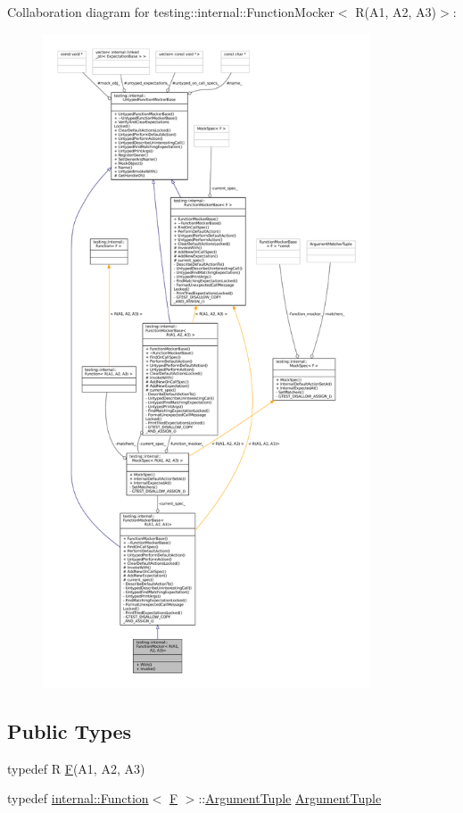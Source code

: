 Collaboration diagram for testing\+:\+:internal\+:\+:Function\+Mocker$<$ R(A1, A2, A3)$>$\+:
\nopagebreak
\begin{figure}[H]
\begin{center}
\leavevmode
\includegraphics[height=550pt]{classtesting_1_1internal_1_1FunctionMocker_3_01R_07A1_00_01A2_00_01A3_08_4__coll__graph}
\end{center}
\end{figure}
\subsection*{Public Types}
\begin{DoxyCompactItemize}
\item 
typedef R \hyperlink{classtesting_1_1internal_1_1FunctionMocker_3_01R_07A1_00_01A2_00_01A3_08_4_a8c471830f963b8012785eb3eeca2cc9c}{F}(A1, A2, A3)
\item 
typedef \hyperlink{structtesting_1_1internal_1_1Function}{internal\+::\+Function}$<$ \hyperlink{classtesting_1_1internal_1_1FunctionMocker_3_01R_07A1_00_01A2_00_01A3_08_4_a8c471830f963b8012785eb3eeca2cc9c}{F} $>$\+::\hyperlink{classtesting_1_1internal_1_1FunctionMocker_3_01R_07A1_00_01A2_00_01A3_08_4_a347dcf4c054a5f1fbd0e2f0ad1c5e2f3}{Argument\+Tuple} \hyperlink{classtesting_1_1internal_1_1FunctionMocker_3_01R_07A1_00_01A2_00_01A3_08_4_a347dcf4c054a5f1fbd0e2f0ad1c5e2f3}{Argument\+Tuple}
\end{DoxyCompactItemize}
